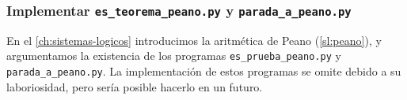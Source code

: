 \subsubsection*{Implementar \texttt{es\_teorema\_peano.py} y \texttt{parada\_a\_peano.py}}

En el \cref{ch:sistemas-logicos} introducimos la aritmética de Peano (\cref{sl:peano}), y argumentamos la existencia de los programas \texttt{es\_prueba\_peano.py} y \texttt{parada\_a\_peano.py}. La implementación de estos programas se omite debido a su laboriosidad, pero sería posible hacerlo en un futuro.

\endinput
